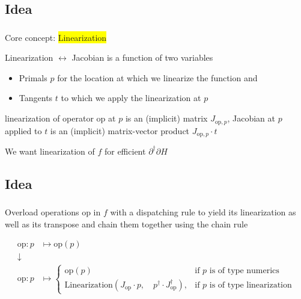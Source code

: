 \documentclass[aspectratio=169,xcolor=dvipsnames]{beamer}
\begin{document}
\subsection{Idea}
\begin{frame}
	\frametitle{\insertsection}
	\framesubtitle{\insertsubsection}

	Core concept: \colorbox{yellow}{Linearization}

	\pause
	\vspace{1em}
	Linearization $\leftrightarrow$ Jacobian is a function of two variables
	\begin{itemize}
		\item Primals $p$ for the location at which we linearize the function and
		\item Tangents $t$ to which we apply the linearization at $p$
	\end{itemize}
	\pause
	linearization of operator $\mathrm{op}$ at $p$ is an (implicit) matrix $J_{\mathrm{op},p}$, Jacobian at $p$ applied to $t$ is an (implicit) matrix-vector product $J_{\mathrm{op},p} \cdot t$

	\pause
	\vspace{1em}
	We want linearization of $f$ for efficient $\partial^\dagger \partial H$

\end{frame}

\subsection{Idea}
\begin{frame}
	\frametitle{\insertsection}
	\framesubtitle{\insertsubsection}

	Overload operations $\mathrm{op}$ in $f$ with a dispatching rule to yield its linearization as well as its transpose and chain them together using the chain rule

	\begin{align*}
		\mathrm{op}: p &\mapsto \mathrm{op}(p)
		\\
		\downarrow
		\\
		\mathrm{op}: p &\mapsto
		\begin{cases}
			\mathrm{op}(p) & \text{if $p$ is of type numerics}
			\\ \text{Linearization}(J_\mathrm{op} \cdot p,\quad p^\dagger \cdot J_\mathrm{op}^\dagger), & \text{if $p$ is of type linearization}
		\end{cases}
	\end{align*}
\end{frame}
\end{document}
